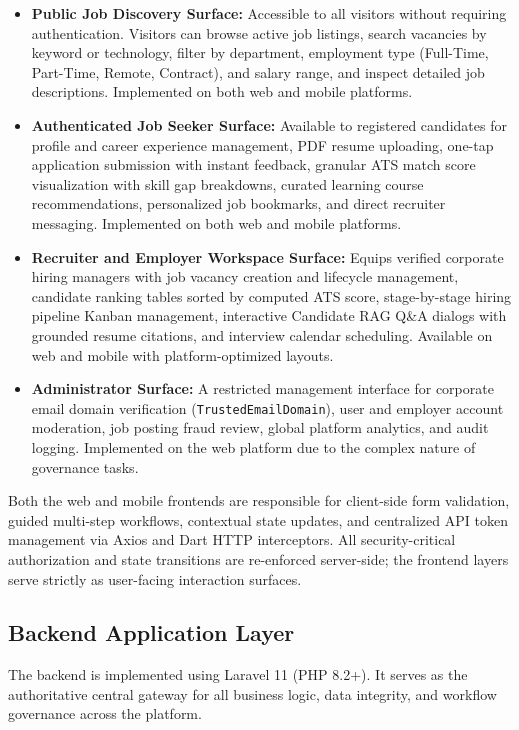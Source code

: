 \begin{itemize}
    \item \textbf{Public Job Discovery Surface:} Accessible to all visitors without requiring authentication. Visitors can browse active job listings, search vacancies by keyword or technology, filter by department, employment type (Full-Time, Part-Time, Remote, Contract), and salary range, and inspect detailed job descriptions. Implemented on both web and mobile platforms.
    \item \textbf{Authenticated Job Seeker Surface:} Available to registered candidates for profile and career experience management, PDF resume uploading, one-tap application submission with instant feedback, granular ATS match score visualization with skill gap breakdowns, curated learning course recommendations, personalized job bookmarks, and direct recruiter messaging. Implemented on both web and mobile platforms.
    \item \textbf{Recruiter and Employer Workspace Surface:} Equips verified corporate hiring managers with job vacancy creation and lifecycle management, candidate ranking tables sorted by computed ATS score, stage-by-stage hiring pipeline Kanban management, interactive Candidate RAG Q\&A dialogs with grounded resume citations, and interview calendar scheduling. Available on web and mobile with platform-optimized layouts.
    \item \textbf{Administrator Surface:} A restricted management interface for corporate email domain verification (\texttt{TrustedEmailDomain}), user and employer account moderation, job posting fraud review, global platform analytics, and audit logging. Implemented on the web platform due to the complex nature of governance tasks.
\end{itemize}

Both the web and mobile frontends are responsible for client-side form validation, guided multi-step workflows, contextual state updates, and centralized API token management via Axios and Dart HTTP interceptors. All security-critical authorization and state transitions are re-enforced server-side; the frontend layers serve strictly as user-facing interaction surfaces.

\subsection{Backend Application Layer}
The backend is implemented using Laravel 11 (PHP 8.2+). It serves as the authoritative central gateway for all business logic, data integrity, and workflow governance across the platform.

